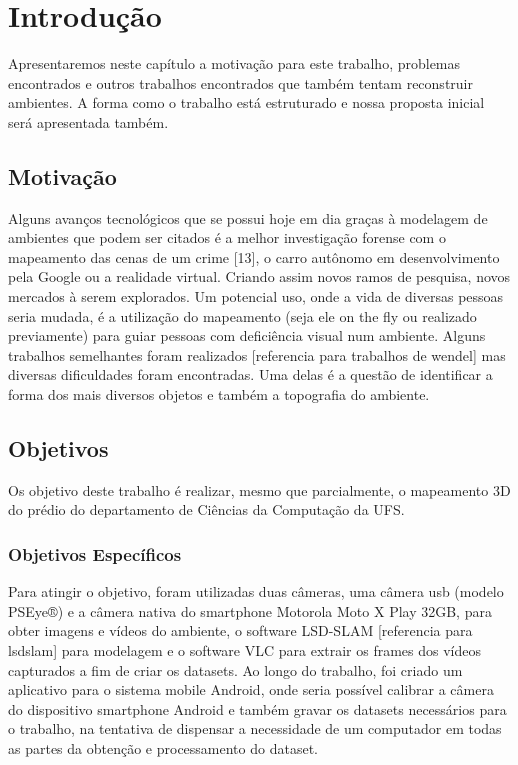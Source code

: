 \chapter{Introdução}

Apresentaremos neste capítulo a motivação para este trabalho, problemas encontrados e outros trabalhos encontrados que também tentam reconstruir ambientes. A forma como o trabalho está estruturado e nossa proposta inicial será apresentada também.


\section{Motivação}

Alguns avanços tecnológicos que se possui hoje em dia graças à modelagem de ambientes que podem ser citados é a melhor investigação forense com o mapeamento das cenas de um crime [13], o carro autônomo em desenvolvimento pela Google ou a realidade virtual. Criando assim novos ramos de pesquisa, novos mercados à serem explorados.
	Um potencial uso, onde a vida de diversas pessoas seria mudada, é a utilização do mapeamento (seja ele on the fly ou realizado previamente) para guiar pessoas com deficiência visual num ambiente. Alguns trabalhos semelhantes foram realizados [referencia para trabalhos de wendel] mas diversas dificuldades foram encontradas. Uma delas é a questão de identificar a forma dos mais diversos objetos e também a topografia do ambiente. 



\section{Objetivos}

Os objetivo deste trabalho é realizar, mesmo que parcialmente, o mapeamento 3D do prédio do departamento de Ciências da Computação da UFS.

\subsection{Objetivos Específicos}

Para atingir o objetivo, foram utilizadas duas câmeras, uma câmera usb (modelo PSEye®) e a câmera nativa do smartphone Motorola Moto X Play 32GB, para obter imagens e vídeos do ambiente, o software LSD-SLAM [referencia para lsdslam] para modelagem e o software VLC para extrair os frames dos vídeos capturados a fim de criar os datasets. Ao longo do trabalho, foi criado um aplicativo para o sistema mobile Android, onde seria possível calibrar a câmera do dispositivo smartphone Android e também gravar os datasets necessários para o trabalho, na tentativa de dispensar a necessidade de um computador em todas as partes da obtenção e processamento do dataset.

